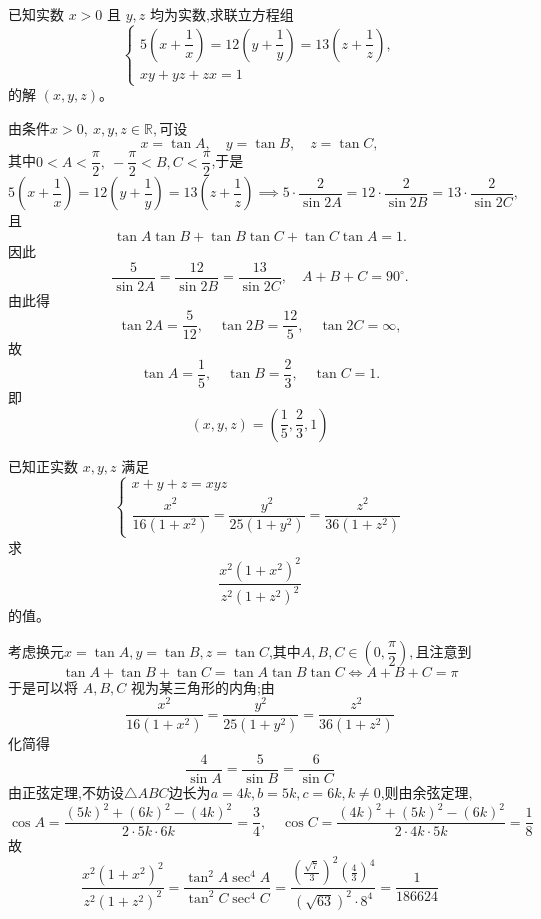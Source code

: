 \begin{questions}
    \question 已知实数 $x>0$ 且 $y, z$ 均为实数,求联立方程组
    \[
    \begin{cases}
    5\left(x + \dfrac{1}{x}\right) = 12\left(y + \dfrac{1}{y}\right) = 13\left(z + \dfrac{1}{z}\right), \\
    xy + yz + zx = 1
    \end{cases}
    \]
    的解 $(x,y,z)$。
    \begin{solution}
        由条件$x > 0, \:x,y,z \in \mathbb{R},$可设
        \[
        x = \tan A, \quad y = \tan B, \quad z = \tan C,
        \]
        其中$0 < A < \dfrac{\pi}{2}, \:-\dfrac{\pi}{2} < B,C < \dfrac{\pi}{2}$,于是
        \[
        5\left(x + \frac{1}{x}\right) = 12\left(y + \frac{1}{y}\right) = 13\left(z + \frac{1}{z}\right) \implies 5 \cdot \frac{2}{\sin 2A} = 12 \cdot \frac{2}{\sin 2B} = 13 \cdot \frac{2}{\sin 2C},
        \]
        且
        \[
        \tan A \tan B + \tan B \tan C + \tan C \tan A = 1.
        \]
        因此
        \[
        \frac{5}{\sin 2A} = \frac{12}{\sin 2B} = \frac{13}{\sin 2C}, \quad A + B + C = 90^\circ.
        \]
        由此得
        \[
        \tan 2A = \frac{5}{12}, \quad \tan 2B = \frac{12}{5}, \quad \tan 2C = \infty,
        \]
        故
        \[
        \tan A = \frac{1}{5}, \quad \tan B = \frac{2}{3}, \quad \tan C = 1.
        \]
        即
        \[
        (x,y,z) = \left(\frac{1}{5}, \frac{2}{3}, 1\right)
        \]
    \end{solution}

    \question 已知正实数 $x,y,z$ 满足
    \[
    \begin{cases}
    x+y+z=xyz\\[4pt]
    \dfrac{x^2}{16(1+x^2)}=\dfrac{y^2}{25(1+y^2)}=\dfrac{z^2}{36(1+z^2)}
    \end{cases}
    \]
    求
    \[
    \frac{x^2(1+x^2)^2}{z^2(1+z^2)^2}
    \]
    的值。
    \begin{solution}
        考虑换元$x=\tan A,y=\tan B,z=\tan C$,其中$A,B,C\in \left(0,\dfrac{\pi}{2}\right),$且注意到
        \[
        \tan A+\tan B+\tan C=\tan A\tan B\tan C \Longleftrightarrow A+B+C=\pi
        \]
        于是可以将 $A,B,C$ 视为某三角形的内角;由
        \[
        \frac{x^2}{16(1+x^2)}=\frac{y^2}{25(1+y^2)}=\frac{z^2}{36(1+z^2)}
        \]
        化简得
        \[
        \frac{4}{\sin A}=\frac{5}{\sin B}=\frac{6}{\sin C}
        \]
        由正弦定理,不妨设$\triangle ABC$边长为$a=4k,b=5k,c=6k,k\ne0$,则由余弦定理,
        \[
        \cos A=\frac{(5k)^2+(6k)^2-(4k)^2}{2\cdot5k\cdot6k}=\frac{3}{4},\quad \cos C=\frac{(4k)^2+(5k)^2-(6k)^2}{2\cdot4k\cdot5k}=\frac{1}{8}
        \]
        故\[
        \frac{x^2(1+x^2)^2}{z^2(1+z^2)^2}=\frac{\tan^2A\sec^4A}{\tan^2C\sec^4C}
        =\frac{(\frac{\sqrt{7}}{3})^2(\frac{4}{3})^4}{(\sqrt{63})^2\cdot 8^4}= \frac{1}{186624}
        \]
    \end{solution}


\end{questions}
